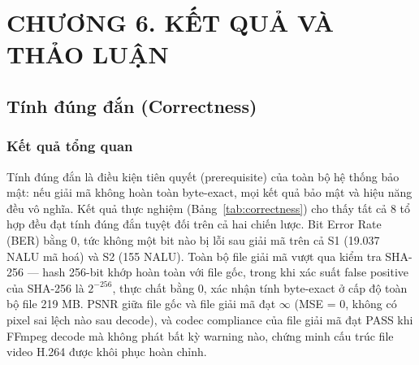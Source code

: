 \clearpage
{}
\section*{CHƯƠNG 6. KẾT QUẢ VÀ THẢO LUẬN}
\setcounter{section}{6}
\setcounter{subsection}{0}
\setcounter{figure}{0}
\setcounter{table}{0}
\setcounter{equation}{0}



\subsection{Tính đúng đắn (Correctness)}

\subsubsection{Kết quả tổng quan}

Tính đúng đắn là điều kiện tiên quyết (prerequisite) của toàn bộ hệ thống bảo mật: nếu giải mã không hoàn toàn byte-exact, mọi kết quả bảo mật và hiệu năng đều vô nghĩa. Kết quả thực nghiệm (Bảng~\ref{tab:correctness}) cho thấy tất cả 8 tổ hợp đều đạt tính đúng đắn tuyệt đối trên cả hai chiến lược. Bit Error Rate (BER) bằng 0, tức không một bit nào bị lỗi sau giải mã trên cả S1 (19.037 NALU mã hoá) và S2 (155 NALU). Toàn bộ file giải mã vượt qua kiểm tra SHA-256 --- hash 256-bit khớp hoàn toàn với file gốc, trong khi xác suất false positive của SHA-256 là $2^{-256}$, thực chất bằng 0, xác nhận tính byte-exact ở cấp độ toàn bộ file 219 MB. PSNR giữa file gốc và file giải mã đạt $\infty$ (MSE = 0, không có pixel sai lệch nào sau decode), và codec compliance của file giải mã đạt PASS khi FFmpeg decode mà không phát bất kỳ warning nào, chứng minh cấu trúc file video H.264 được khôi phục hoàn chỉnh.

